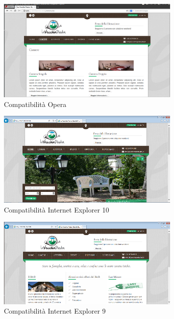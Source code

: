 \documentclass[a4paper,12pt,hidelinks]{report}
\begin{document}
\begin{figure}[h!]%
    \includegraphics[width=0.8\textwidth,keepaspectratio=true]{../img/compOpera}
    \centering
    \caption{Compatibilità Opera}%
    \label{fig:compOpera}%
\end{figure}
\newpage
\begin{figure}[h!]%
    \includegraphics[width=0.8\textwidth,keepaspectratio=true]{../img/compIe10}
    \centering
    \caption{Compatibilità Internet Explorer 10}%
    \label{fig:compIe10}%
\end{figure}

\begin{figure}[h!]%
    \includegraphics[width=0.8\textwidth,keepaspectratio=true]{../img/compIe9}
    \centering
    \caption{Compatibilità Internet Explorer 9}%
    \label{fig:compIe9}%
\end{figure}
\end{document}
